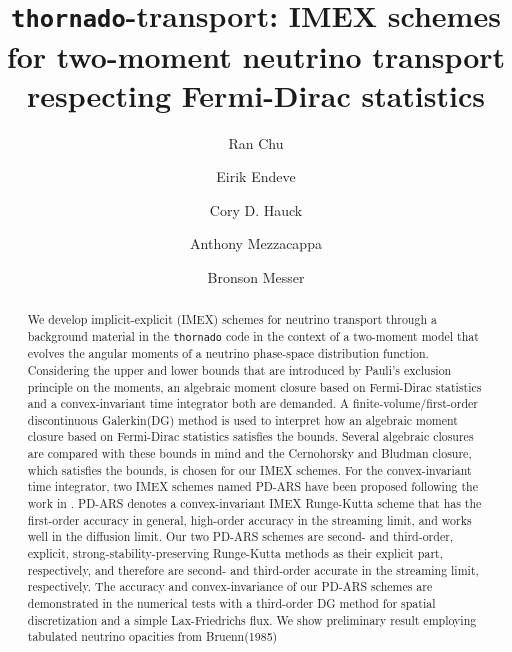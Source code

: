 \documentclass[a4paper]{jpconf}
\begin{document}
\title{\texttt{thornado}-transport: IMEX schemes for two-moment neutrino transport respecting Fermi-Dirac statistics}

\author{Ran Chu}
\address{Department of Physics and Astronomy, University of Tennessee Knoxville, TN 37996-1200}

\author{Eirik Endeve}
\address{Computational and Applied Mathematics Group, Oak Ridge National Laboratory, Oak Ridge, TN 37831 USA}
\address{Department of Physics and Astronomy, University of Tennessee Knoxville, TN 37996-1200}

\author{Cory D. Hauck}
\address{Computational and Applied Mathematics Group, Oak Ridge National Laboratory, Oak Ridge, TN 37831 USA}
\address{Department of Mathematics, University of Tennessee Knoxville, TN 37996-1320}

\author{Anthony Mezzacappa}
\address{Department of Physics and Astronomy, University of Tennessee Knoxville, TN 37996-1200}

\author{Bronson Messer}
\address{Scientific Computing and Theoretical Physics Groups, Oak Ridge National Laboratory, Oak Ridge, TN 37831 USA}
\address{Department of Physics and Astronomy, University of Tennessee Knoxville, TN 37996-1200}

\begin{abstract}
We develop implicit-explicit (IMEX) schemes for neutrino transport through a background material in the \texttt{thornado} code in the context of a two-moment model that evolves the angular moments of a neutrino phase-space distribution function.
Considering the upper and lower bounds that are introduced by Pauli's exclusion principle on the moments, an algebraic moment closure based on Fermi-Dirac statistics and a convex-invariant time integrator both are demanded.
A finite-volume/first-order discontinuous Galerkin(DG) method is used to interpret how an algebraic moment closure based on Fermi-Dirac statistics satisfies the bounds.
Several algebraic closures are compared with these bounds in mind and the Cernohorsky and Bludman closure\cite{cernohorskyBludman_1994}, which satisfies the bounds, is chosen for our IMEX schemes.
For the convex-invariant time integrator, two IMEX schemes named PD-ARS have been proposed following the work in \cite{chu_etal_2018}.
PD-ARS denotes a convex-invariant IMEX Runge-Kutta scheme that has the first-order accuracy in general, high-order accuracy in the streaming limit, and works well in the diffusion limit.
Our two PD-ARS schemes are second- and third-order, explicit, strong-stability-preserving Runge-Kutta methods\cite{gottlieb_etal_2001} as their explicit part, respectively, and therefore are second- and third-order accurate in the streaming limit, respectively.
The accuracy and convex-invariance of our PD-ARS schemes are demonstrated in the numerical tests with a third-order DG method for spatial discretization and a simple Lax-Friedrichs flux.
We show preliminary result employing tabulated neutrino opacities from Bruenn(1985)\citep{Bruenn_1985}

\end{abstract}
\end{document}
